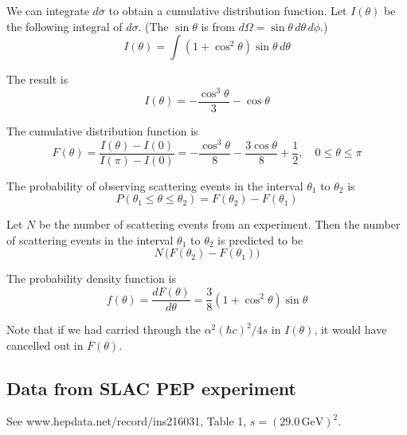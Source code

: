 \documentclass[12pt]{article}
\begin{document}
We can integrate $d\sigma$ to obtain a cumulative distribution function.
Let $I(\theta)$ be the following integral of $d\sigma$.
(The $\sin\theta$ is from $d\Omega=\sin\theta\,d\theta\,d\phi$.)
\begin{equation*}
I(\theta)=\int
\left(1+\cos^2\theta\right)
\sin\theta\,d\theta
\end{equation*}

The result is
\begin{equation*}
I(\theta)=-\frac{\cos^3\theta}{3}-\cos\theta
\end{equation*}

The cumulative distribution function is
\begin{equation*}
F(\theta)=\frac{I(\theta)-I(0)}{I(\pi)-I(0)}
=-\frac{\cos^3\theta}{8}-\frac{3\cos\theta}{8}+\frac{1}{2},
\quad
0\le\theta\le\pi
\end{equation*}

The probability of observing scattering events in the interval $\theta_1$ to $\theta_2$ is
\begin{equation*}
P(\theta_1\le\theta\le\theta_2)=F(\theta_2)-F(\theta_1)
\end{equation*}

Let $N$ be the number of scattering events from an experiment.
Then the number of scattering events in the interval $\theta_1$
to $\theta_2$ is predicted to be
$$
N\,\bigl(F(\theta_2)-F(\theta_1)\bigr)
$$

The probability density function is
$$
f(\theta)=\frac{dF(\theta)}{d\theta}
=\frac{3}{8}
\left(1+\cos^2\theta\right)
\sin\theta
$$

Note that if we had carried through the $\alpha^2(\hbar c)^2/4s$ in $I(\theta)$,
it would have cancelled out in $F(\theta)$.

\subsection*{Data from SLAC PEP experiment}
See www.hepdata.net/record/ins216031, Table 1, $s=(29.0\,\text{GeV})^2$.
\end{document}
